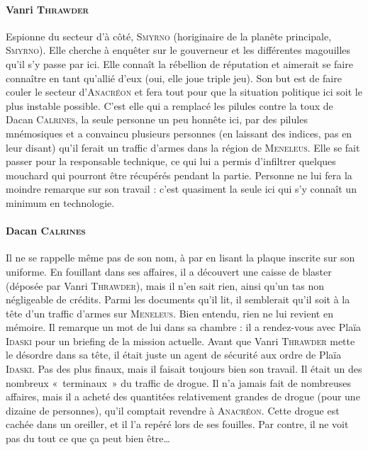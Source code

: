 \documentclass{article}
\begin{document}
{\paragraph{Vanri \textsc{Thrawder}}
{
Espionne du secteur d’à côté, \textsc{Smyrno} (horiginaire de la planête principale, \textsc{Smyrno}).
Elle cherche à enquêter sur le gouverneur et les différentes magouilles qu’il s’y passe par ici.
Elle connaît la rébellion de réputation et aimerait se faire connaître en tant qu’allié d’eux (oui, elle joue triple jeu).
Son but est de faire couler le secteur d’\textsc{Anacréon} et fera tout pour que la situation politique ici soit le plus instable possible.
C’est elle qui a remplacé les pilules contre la toux de Dacan \textsc{Calrines}, la seule personne un peu honnête ici, par des pilules mnémosiques et a convaincu plusieurs personnes (en laissant des indices, pas en leur disant) qu’il ferait un traffic d’armes dans la région de \textsc{Meneleus}.
Elle se fait passer pour la responsable technique, ce qui lui a permis d’infiltrer quelques mouchard qui pourront être récupérés pendant la partie.
Personne ne lui fera la moindre remarque sur son travail : c’est quasiment la seule ici qui s’y connaît un minimum en technologie.
}

\paragraph{Dacan \textsc{Calrines}}
{
Il ne se rappelle même pas de son nom, à par en lisant la plaque inscrite sur son uniforme.
En fouillant dans ses affaires, il a découvert une caisse de blaster (déposée par Vanri \textsc{Thrawder}), mais il n’en sait rien, ainsi qu’un tas non négligeable de crédits.
Parmi les documents qu’il lit, il semblerait qu’il soit à la tête d’un traffic d’armes sur \textsc{Meneleus}.
Bien entendu, rien ne lui revient en mémoire.
Il remarque un mot de lui dans sa chambre : il a rendez-vous avec Plaïa \textsc{Idaski} pour un briefing de la mission actuelle.
Avant que Vanri \textsc{Thrawder} mette le désordre dans sa tête, il était juste un agent de sécurité aux ordre de Plaïa \textsc{Idaski}.
Pas des plus finaux, mais il faisait toujours bien son travail.
Il était un des nombreux «~terminaux~» du traffic de drogue.
Il n’a jamais fait de nombreuses affaires, mais il a acheté des quantitées relativement grandes de drogue (pour une dizaine de personnes), qu’il comptait revendre à \textsc{Anacréon}.
Cette drogue est cachée dans un oreiller, et il l’a repéré lors de ses fouilles.
Par contre, il ne voit pas du tout ce que ça peut bien être\ldots
}

\newpage
}
\end{document}
